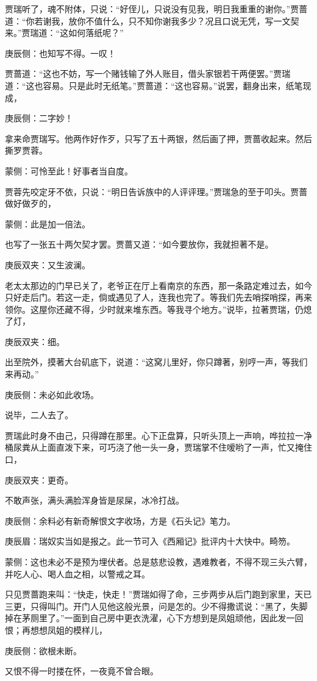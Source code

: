\begin{parag}
    贾瑞听了，魂不附体，只说：“好侄儿，只说没有见我，明日我重重的谢你。”贾蔷道：“你若谢我，放你不值什么，只不知你谢我多少？况且口说无凭，写一文契来。”贾瑞道：“这如何落纸呢？”\begin{note}庚辰侧：也知写不得。一叹！\end{note}贾蔷道：“这也不妨，写一个赌钱输了外人账目，借头家银若干两便罢。”贾瑞道：“这也容易。只是此时无纸笔。”贾蔷道：“这也容易。”说罢，翻身出来，纸笔现成，\begin{note}庚辰侧：二字妙！\end{note}拿来命贾瑞写。他两作好作歹，只写了五十两银，然后画了押，贾蔷收起来。然后撕罗贾蓉。\begin{note}蒙侧：可怜至此！好事者当自度。\end{note}贾蓉先咬定牙不依，只说：“明日告诉族中的人评评理。”贾瑞急的至于叩头。贾蔷做好做歹的，\begin{note}蒙侧：此是加一倍法。\end{note}也写了一张五十两欠契才罢。贾蔷又道：“如今要放你，我就担著不是。\begin{note}庚辰双夹：又生波澜。\end{note}老太太那边的门早已关了，老爷正在厅上看南京的东西，那一条路定难过去，如今只好走后门。若这一走，倘或遇见了人，连我也完了。等我们先去哨探哨探，再来领你。这屋你还藏不得，少时就来堆东西。等我寻个地方。”说毕，拉著贾瑞，仍熄了灯，\begin{note}庚辰双夹：细。\end{note}出至院外，摸著大台矶底下，说道：“这窝儿里好，你只蹲著，别哼一声，等我们来再动。”\begin{note}庚辰侧：未必如此收场。\end{note}说毕，二人去了。
\end{parag}


\begin{parag}
    贾瑞此时身不由己，只得蹲在那里。心下正盘算，只听头顶上一声响，哗拉拉一净桶尿粪从上面直泼下来，可巧浇了他一头一身，贾瑞掌不住嗳哟了一声，忙又掩住口，\begin{note}庚辰双夹：更奇。\end{note}不敢声张，满头满脸浑身皆是尿屎，冰冷打战。\begin{note}庚辰侧：余料必有新奇解恨文字收场，方是《石头记》笔力。\end{note}\begin{note}庚辰眉：瑞奴实当如是报之。此一节可入《西厢记》批评内十大快中。畸笏。\end{note}\begin{note}蒙侧：这也未必不是预为埋伏者。总是慈悲设教，遇难教者，不得不现三头六臂，并吃人心、喝人血之相，以警戒之耳。\end{note}只见贾蔷跑来叫：“快走，快走！”贾瑞如得了命，三步两步从后门跑到家里，天已三更，只得叫门。开门人见他这般光景，问是怎的。少不得撒谎说：“黑了，失脚掉在茅厕里了。”一面到自己房中更衣洗濯，心下方想到是凤姐顽他，因此发一回恨；再想想凤姐的模样儿，\begin{note}庚辰侧：欲根未断。\end{note}又恨不得一时搂在怀，一夜竟不曾合眼。
\end{parag}


